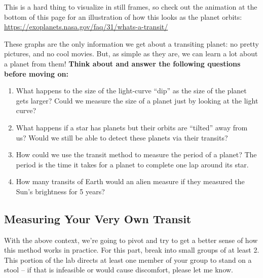 \documentclass[11pt]{article}
\begin{document}
\medskip \noindent
This is a hard thing to visualize in still frames, so check out the animation at the bottom of this page for an illustration of how this looks as the planet orbits: \url{https://exoplanets.nasa.gov/faq/31/whats-a-transit/}

\medskip \noindent
These graphs are the only information we get about a transiting planet: no pretty pictures, and no cool movies. But, as simple as they are, we can learn a lot about a planet from them! \textbf{Think about and answer the following questions before moving on:}

\begin{enumerate}[resume]
    \item What happens to the size of the light-curve ``dip” as the size of the planet gets larger? Could we measure the size of a planet just by looking at the light curve?
    
    \item What happens if a star has planets but their orbits are ``tilted” away from us? Would we still be able to detect these planets via their transits?
    
    \item How could we use the transit method to measure the period of a planet? The period is the time it takes for a planet to complete one lap around its star.
    
    \item How many transits of Earth would an alien measure if they measured the Sun’s brightness for 5 years?
\end{enumerate}

\subsection{Measuring Your Very Own Transit}
\noindent
With the above context, we’re going to pivot and try to get a better sense of how this method works in practice. For this part, break into small groups of at least 2. This portion of the lab directs at least one member of your group to stand on a stool -- if that is infeasible or would cause discomfort, please let me know.
\end{document}
